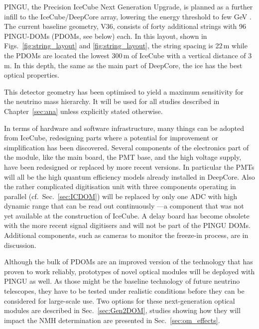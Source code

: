 PINGU, the Precision IceCube Next Generation Upgrade, is planned as a further 
infill to the IceCube/DeepCore array, lowering the energy threshold to few GeV 
\cite{LoI}. The current baseline geometry, V36, consists of forty additional 
strings with 96 PINGU-DOMs (PDOMs, see below) each. In this layout, shown in
Figs.~\ref{fig:string_layout} and \ref{fig:string_layout}, the string spacing is
22\,m while the PDOMs are located the lowest 300\,m of IceCube with a vertical
distance of 3\,m. In this depth, the same as the main part of DeepCore, the ice
has the best optical properties.

This detector geometry has been optimised to yield a maximum sensitivity for 
the neutrino mass hierarchy. It will be used for all studies described in 
Chapter~\ref{sec:ana} unless explicitly stated otherwise.

In terms of hardware and software infrastructure, many things can be adopted 
from IceCube, redesigning parts where a potential for improvement or 
simplification has been discovered. Several components of the electronics part
of the module, like the main board, the PMT base, and the high voltage supply,
have been redesigned or replaced by more recent versions. In particular the PMTs
will all be the high quantum efficiency models already installed in DeepCore.
Also the rather complicated digitisation unit with three components operating
in parallel (cf.~Sec.~\ref{sec:ICDOM}) will be replaced by only one ADC with
high dynamic range that can be read out continuously \cite{PDOM_Aachen}---a
component that was not yet available at the construction of IceCube.
A delay board has become obsolete with the more recent signal digitisers and
will not be part of the PINGU DOMs. Additional components, such as cameras to
monitor the freeze-in process, are in discussion.

Although the bulk of PDOMs are an improved version of the technology that has 
proven to work reliably, prototypes of novel optical modules will be deployed 
with PINGU as well. As those might be the baseline technology of future 
neutrino telescopes, they have to be tested under realistic conditions before 
they can be considered for large-scale use. Two options for these 
next-generation optical modules are described in Sec.~\ref{sec:Gen2DOM}, 
studies showing how they will impact the NMH determination are presented in 
Sec.~\ref{sec:om_effects}.

